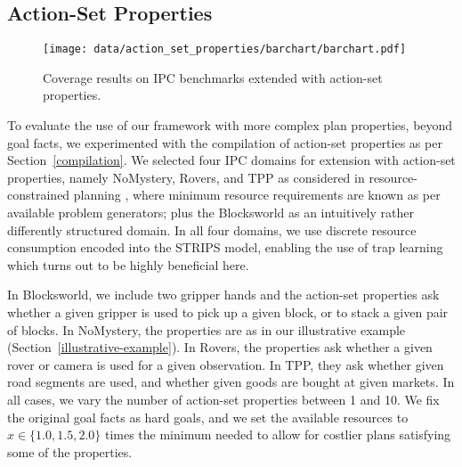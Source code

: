 \fi









\ifdefined\suppflagdefined

\subsection{Action-Set Properties}

\begin{figure*}[htb]
\centering\centering
%
\texttt{[image: data/action\_set\_properties/barchart/barchart.pdf]}
\vspace{-0.6cm}
\caption{Coverage results on IPC benchmarks extended with action-set properties.}
\label{fig:barcharts}
\vspace{-0.2cm}
\end{figure*}

To evaluate the use of our framework with more complex plan
properties, beyond goal facts, we experimented with the compilation of
action-set properties as per Section~\ref{compilation}. We selected
four IPC domains for extension with action-set properties, namely
NoMystery, Rovers, and TPP as considered in resource-constrained
planning \cite{nakhost:etal:icaps-12}, where minimum resource
requirements are known as per available problem generators; plus the
Blocksworld as an intuitively rather differently structured domain. In
all four domains, we use discrete resource consumption encoded into
the STRIPS model, enabling the use of trap
learning \cite{steinmetz:hoffmann:ijcai-17} which turns out to be
highly beneficial here.

In Blocksworld, we include two gripper hands and the action-set
properties ask whether a given gripper is used to pick up a given
block, or to stack a given pair of blocks. In NoMystery, the
properties are as in our illustrative example
(Section~\ref{illustrative-example}). In Rovers, the properties ask
whether a given rover or camera is used for a given observation. In
TPP, they ask whether given road segments are used, and whether given
goods are bought at given markets. In all cases, we vary the number of
action-set properties between 1 and 10. We fix the original goal facts
as hard goals, and we set the available resources to $x \in \{1.0,1.5,
2.0\}$ times the minimum needed to allow for costlier plans satisfying
some of the properties.

